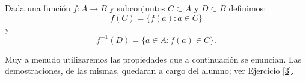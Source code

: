 \begin{definicion} Dada una función $f:A\longrightarrow B$ y subconjuntos
$C\subset A$ y $D\subset B$ definimos:
\[f(C)=\{f(a):a\in C\}\]
y
\[f^{-1}(D)=\{a\in A:f(a)\in C\}.\]
\end{definicion}











Muy a menudo utilizaremos las propiedades que a continuación se
enuncian. Las demostraciones, de las mismas, quedaran a cargo del
alumno; ver Ejercicio \vref{3}.

